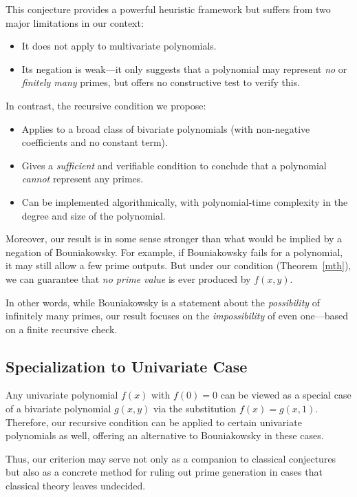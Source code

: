 \documentclass[a4paper,11pt]{article}
\begin{document}
	This conjecture provides a powerful heuristic framework but suffers from two major limitations in our context:
	\begin{itemize}
		\item It does not apply to multivariate polynomials.
		\item Its negation is weak—it only suggests that a polynomial may represent \emph{no} or \emph{finitely many} primes, but offers no constructive test to verify this.
	\end{itemize}
	
	In contrast, the recursive condition we propose:
	\begin{itemize}
		\item Applies to a broad class of bivariate polynomials (with non-negative coefficients and no constant term).
		\item Gives a \emph{sufficient} and verifiable condition to conclude that a polynomial \emph{cannot} represent any primes.
		\item Can be implemented algorithmically, with polynomial-time complexity in the degree and size of the polynomial.
	\end{itemize}
	
	Moreover, our result is in some sense stronger than what would be implied by a negation of Bouniakowsky. For example, if Bouniakowsky fails for a polynomial, it may still allow a few prime outputs. But under our condition (Theorem~\ref{mth}), we can guarantee that \emph{no prime value} is ever produced by $f(x, y)$.
	
	In other words, while Bouniakowsky is a statement about the \emph{possibility} of infinitely many primes, our result focuses on the \emph{impossibility} of even one—based on a finite recursive check.
	
	\subsection*{Specialization to Univariate Case}
	
	Any univariate polynomial $f(x)$ with $f(0) = 0$ can be viewed as a special case of a bivariate polynomial $g(x, y)$ via the substitution $f(x) = g(x, 1)$. Therefore, our recursive condition can be applied to certain univariate polynomials as well, offering an alternative to Bouniakowsky in these cases.
	
	Thus, our criterion may serve not only as a companion to classical conjectures but also as a concrete method for ruling out prime generation in cases that classical theory leaves undecided.
	
\end{document}
